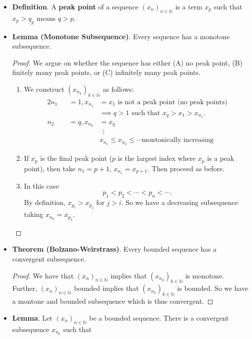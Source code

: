 \documentclass{article}
\newcommand{\N}{\mathbb{N}}
\newcommand{\seq}[2]{(#1_{#2})_{#2 \in \N}}
\newcommand{\?}{\stackrel{?}{=}}
\begin{document}
\begin{itemize}
    \item \textbf{Definition}. A \textbf{peak point} of a sequence $\seq{x}{n}$ is a term $x_p$ such that $x_p > q_p$ means $q > p$.
    \item \textbf{Lemma (Monotone Subsequence)}. Every sequence has a monotone subsequence.
    \begin{proof}
        We argue on whether the sequence has either (A) no peak point, (B) finitely many peak points, or (C) infinitely many peak points.
        \begin{enumerate}[label=(\Alph*)]
            \item We construct $(x_{n_k})_{k \in \N}$ as follows:
            \begin{alignat*}{2}
                n_1 &&= 1, x_{n_1} &= x_1 \text{ is not a peak point (no peak points)} \\
                && &\implies q>1 \text{ such that } x_q > x_1 > x_{n_1}. \\
                n_2 &&= q, x_{n_2} &= x_q \\
                && &\hspace{6pt}\vdots \\
                && & x_{n_1} \leq x_{n_2} \leq \cdots \text{montonically increasing}
            \end{alignat*}
            \item If $x_p$ is the final peak point ($p$ is the largest index where $x_p$ is a peak point), then take $n_1 = p + 1$, $x_{n_1} = x_{p + 1}$. Then proceed as before.
            \item In this case
            $$p_1 < p_2 < \cdots < p_n < \cdots.$$
            By definition, $x_{p_i} > x_{p_j}$ for $j > i$. So we have a decreasing subsequence taking $x_{n_k} = x_{p_k}$.
        \end{enumerate}
    \end{proof}
    \item \textbf{Theorem (Bolzano-Weirstrass)}. Every bounded sequence has a convergent subsequence.
    \begin{proof}
        We have that $\seq{x}{n}$ implies that $(x_{n_k})_{k \in \N}$ is monotone. Further, $\seq{x}{n}$ bounded implies that $(x_{n_k})_{k \in \N}$ is bounded. So we have a montone and bounded subsequence which is thus convergent.
    \end{proof}
    \item \textbf{Lemma}. Let $\seq{x}{n}$ be a bounded sequence. There is a convergent subsequence $x_{n_k}$ such that

\end{itemize}
\end{document}
